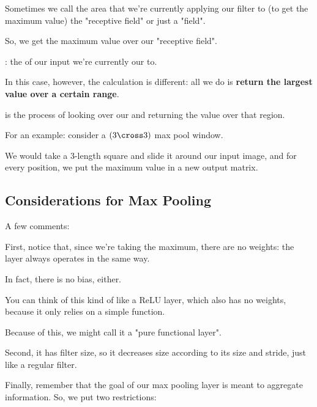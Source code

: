         Sometimes we call the area that we're currently applying our filter to (to get the maximum value) the "receptive field" or just a "field".
        
        So, we get the maximum value over our "receptive field".
        
        \begin{definition}
            : the  of our input we're currently  our  to.
        \end{definition}
        
        In this case, however, the calculation is different: all we do is \textbf{return the largest value over a certain range}.\\
        
        \begin{definition}
             is the process of looking over our  and returning the  value over that region.
        \end{definition}
        
        
        
        For an example: consider a $(3 \cross 3)$ max pool window.
        
        We would take a 3-length square and slide it around our input image, and for every position, we put the maximum value in a new output matrix.
        
        
    \subsection{Considerations for Max Pooling}
    
        A few comments:
        
        First, notice that, since we're taking the maximum, there are no weights: the layer always operates in the same way.
        
        In fact, there is no bias, either.
        
        You can think of this kind of like a ReLU layer, which also has no weights, because it only relies on a simple function.
        
        Because of this, we might call it a "pure functional layer".
        
        Second, it has filter size, so it decreases size according to its size and stride, just like a regular filter.
        
        Finally, remember that the goal of our max pooling layer is meant to aggregate information. So, we put two restrictions:
        
